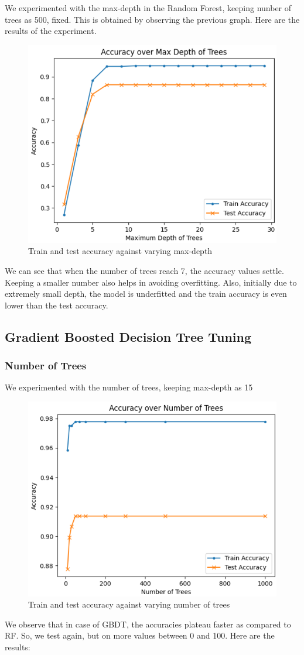We experimented with the  max-depth in the Random Forest, keeping nunber of trees as 500, fixed. This is obtained by observing the previous graph. Here are the results of the experiment.\\
\begin{figure}[htbp]
    \centering
    \includegraphics[width=0.8\linewidth]{images/rf_acc_max_depth.png}
    \caption*{Train and test accuracy against varying max-depth}
    \label{fig:your_label}
\end{figure}
\newline
We can see that when the number of trees reach 7, the accuracy values settle. Keeping a smaller number also helps in avoiding overfitting. Also, initially due to extremely small depth, the model is underfitted and the train accuracy is even lower than the test accuracy.

\newpage
\subsection{Gradient Boosted Decision Tree Tuning}
\subsubsection{Number of Trees}
We experimented with the number of trees, keeping max-depth as 15\\
\begin{figure}[htbp]
    \centering
    \includegraphics[width=0.58\linewidth]{images/gbdt_acc_num_trees1.png}
    \caption*{Train and test accuracy against varying number of trees}
    \label{fig:your_label}
\end{figure}
\newline
We observe that in case of GBDT, the accuracies plateau faster as compared to RF. So, we test again, but on more  values between 0 and 100. Here are the results:

